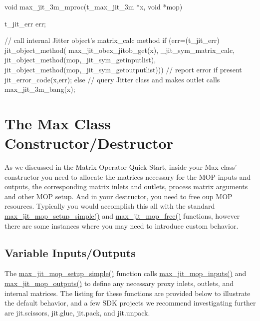 \begin{DoxyCode}
void max_jit_3m_mproc(t_max_jit_3m *x, void *mop)
{
   t_jit_err err;
   
   // call internal Jitter object's matrix_calc method
   if (err=(t_jit_err) jit_object_method(
      max_jit_obex_jitob_get(x),
      _jit_sym_matrix_calc,
      jit_object_method(mop,_jit_sym_getinputlist),
      jit_object_method(mop,_jit_sym_getoutputlist))) 
   {
      // report error if present
      jit_error_code(x,err); 
   } else {
      // query Jitter class and makes outlet calls
      max_jit_3m_bang(x);
   }
}
\end{DoxyCode}
\hypertarget{chapter_jit_mopdetails_chapter_jit_mopdetails_maxclassctor}{}\section{The Max Class Constructor/Destructor}\label{chapter_jit_mopdetails_chapter_jit_mopdetails_maxclassctor}
As we discussed in the Matrix Operator Quick Start, inside your Max class' constructor you need to allocate the matrices necessary for the MOP inputs and outputs, the corresponding matrix inlets and outlets, process matrix arguments and other MOP setup. And in your destructor, you need to free oup MOP resources. Typically you would accomplish this all with the standard \hyperlink{group__maxmopmod_gac3eaca207281516b72e81f0dc5f4bf94}{max\_\-jit\_\-mop\_\-setup\_\-simple()} and \hyperlink{group__maxmopmod_ga441ff70d705e1eccff8297437c85e46c}{max\_\-jit\_\-mop\_\-free()} functions, however there are some instances where you may need to introduce custom behavior.\hypertarget{chapter_jit_mopdetails_chapter_jit_mopdetails_maxclassctor_vario}{}\subsection{Variable Inputs/Outputs}\label{chapter_jit_mopdetails_chapter_jit_mopdetails_maxclassctor_vario}
The \hyperlink{group__maxmopmod_gac3eaca207281516b72e81f0dc5f4bf94}{max\_\-jit\_\-mop\_\-setup\_\-simple()} function calls \hyperlink{group__maxmopmod_gaec99be7b60c1cec6a8391097d5008bc6}{max\_\-jit\_\-mop\_\-inputs()} and \hyperlink{group__maxmopmod_ga07f044bc4c7fe4380f31e150844948df}{max\_\-jit\_\-mop\_\-outputs()} to define any necessary proxy inlets, outlets, and internal matrices. The listing for these functions are provided below to illustrate the default behavior, and a few SDK projects we recommend investigating further are jit.scissors, jit.glue, jit.pack, and jit.unpack.


